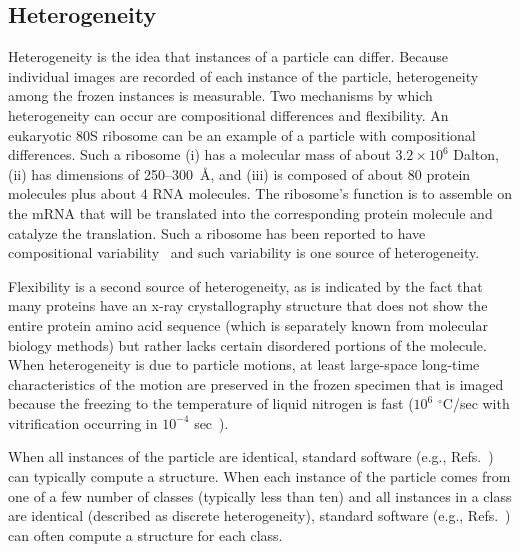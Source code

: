 \subsection{Heterogeneity}
\label{sec:introduction:heterogeneity}
Heterogeneity is the idea that instances of a particle can differ.
Because individual images are recorded of each instance of the particle,
heterogeneity among the frozen instances is measurable.
Two mechanisms by which heterogeneity can occur are compositional
differences and flexibility.
An eukaryotic 80S ribosome can be an example of a particle with
compositional differences.
Such a ribosome
(i) has a molecular mass of about $3.2\times 10^6$ Dalton,
(ii) has dimensions of 250--300~{\AA}, and
(iii) is composed of about 80 protein molecules plus about 4 RNA molecules.
The ribosome's function is to assemble on the mRNA that will be translated
into the corresponding protein molecule and catalyze the translation.
Such a ribosome has been reported to have compositional
variability~\cite{SlavovSemrauAiroldiBudnikVanOudenaardenRibosomeHeterogeneityCellReports2015}
and such variability is one source of heterogeneity.
\par
Flexibility is a second source of heterogeneity, as is
indicated by the fact that many proteins have an x-ray crystallography
structure that does not show the entire protein amino acid sequence (which
is separately known from molecular biology methods) but rather lacks
certain disordered portions of the molecule.
When heterogeneity is due to particle motions, at least large-space
long-time characteristics of the motion are preserved in the frozen
specimen that is imaged because the freezing to the temperature of liquid
nitrogen is fast ($10^6$ ${}^\circ$C/sec with vitrification occurring in
$10^{-4}$
sec~\cite{DubochetAdrianChangHomoLepaultMcDowallSchultzEarlyCryoEMQuarterlyRevBiophys1988}).
\par
When all instances of the particle are identical, standard software (e.g.,
Refs.~\cite{TangPengBaldwinMannJiangReesLudtkeJSB2007EMAN2,ScheresRELIONimplementationJMB2012,Shaikh...Frank.spider.NatureProtocols2008})
can typically compute a structure.
When each instance of the particle comes from one of a few number of
classes (typically less than ten) and all instances in a class are
identical (described as discrete heterogeneity), standard software (e.g.,
Refs.~\cite{TangPengBaldwinMannJiangReesLudtkeJSB2007EMAN2,ScheresRELIONimplementationJMB2012,Shaikh...Frank.spider.NatureProtocols2008})
can often compute a structure for each class.
